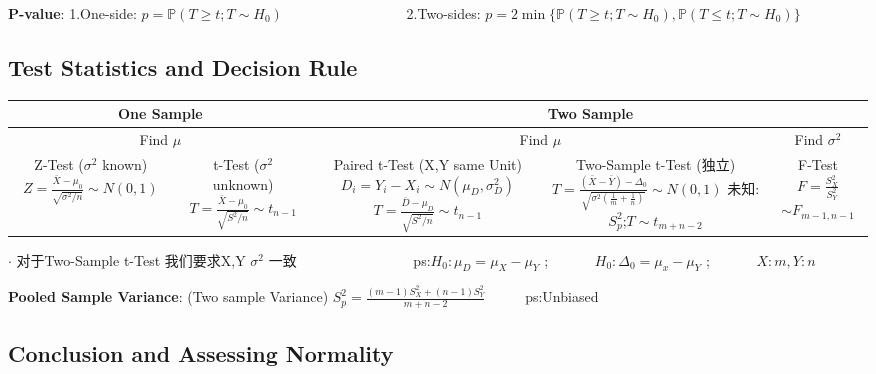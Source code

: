 \documentclass[9pt]{article}
\begin{document}
    \textbf{P-value}: 1.One-side: $p=\mathbb{P}(T\geq t;T\sim H_0)$ \ \ \ \ \ \ \ \ \ \ \ \ \ \ \ \ \ 2.Two-sides: $p=2\min\{\mathbb{P}(T\geq t;T\sim H_0),\mathbb{P}(T\leq t;T\sim H_0)\}$

    \subsection{Test Statistics and Decision Rule}

    \vspace{-0.4cm}
    \begin{longtable}{|c|c|c|c|c|}
        \hline
        \multicolumn{2}{|c|}{One Sample} & \multicolumn{3}{c|}{Two Sample}                   \\
        \hline
        \multicolumn{2}{|c|}{Find $\mu$} & \multicolumn{2}{c|}{Find $\mu$} & Find $\sigma^2$ \\
        \hline
        \makecell{Z-Test ($\sigma^2$ known)                                                  \\ $Z=\frac{\bar{X}-\mu_0}{\sqrt{\sigma^2/n}}\sim N(0,1)$} & \makecell{t-Test ($\sigma^2$ unknown) \\ $T=\frac{\bar{X}-\mu_0}{\sqrt{S^2/n}}\sim t_{n-1}$} & \makecell{Paired t-Test (X,Y same Unit) \\ $D_i=Y_i-X_i\sim N(\mu_D,\sigma^2_D)$ \\ $T=\frac{\bar{D}-\mu_D}{\sqrt{S^2/n}}\sim t_{n-1}$} & \makecell{Two-Sample t-Test (独立) \\ $T=\frac{(\bar{X}-\bar{Y})-\Delta_0}{\sqrt{\sigma^2(\frac{1}{m}+\frac{1}{n})}}\sim N(0,1)$ \\ {\fontsize{10}{12}\selectfont 未知:}$S^2_p$;$T\sim t_{m+n-2}$} & \makecell{F-Test \\ $F=\frac{S^2_X}{S^2_Y}$ \\ $\sim F_{m-1,n-1}$} \\
        \hline
    \end{longtable}
    \vspace{-0.4cm}

$\cdot$ 对于Two-Sample t-Test 我们要求X,Y $\sigma^2$ 一致 \ \ \ \ \ \ \ \ \ \ \ \ \ \ \ \  ps:$H_0:\mu_D=\mu_X-\mu_Y$ ; \ \ \ \ \ \  $H_0:\Delta_0=\mu_x-\mu_Y$ ; \ \ \ \ \ \ $X:m,Y:n$

    \textbf{Pooled Sample Variance}: (Two sample Variance) $S^2_p=\frac{(m-1)S^2_X+(n-1)S^2_Y}{m+n-2}$ \ \ \ \ \ ps:Unbiased

    \subsection{Conclusion and Assessing Normality}
\end{document}
